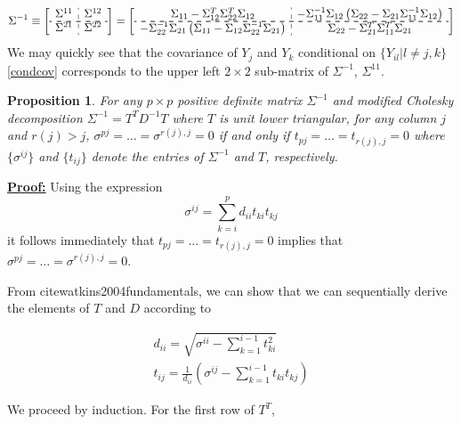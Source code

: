 \documentclass[12pt]{article}
\newtheorem{proposition}[theorem]{Proposition}
\theoremstyle{definition}
\begin{document}
\begin{equation}
\Sigma^{-1} \equiv \left[\begin{array}{c:c} \Sigma^{11} & \Sigma^{12}  \\ \cdashline{1-2}  \hdashline \Sigma^{21} & \Sigma^{22}  \end{array}\right]  = \left[\begin{array}{c:c}  \Sigma_{11} - \Sigma_{12}^T\Sigma_{22}^T\Sigma_{12}  & -\Sigma_{11}^{-1}\Sigma_{12}\left(\Sigma_{22} - \Sigma_{21}\Sigma_{11}^{-1}\Sigma_{12} \right) \\ \cdashline{1-2}  \hdashline -\Sigma_{22}^{-1}\Sigma_{21}\left(\Sigma_{11} - \Sigma_{12}\Sigma_{22}^{-1}\Sigma_{21} \right)  &  \Sigma_{22} - \Sigma_{21}^T\Sigma_{11}^T\Sigma_{21}  \end{array}\right] 
\end{equation}
\noindent
We may quickly see that the covariance of $Y_{j}$ and $Y_{k}$ conditional on $\lbrace Y_{il}\vert l\ne j,k \rbrace$ \eqref{condcov} corresponds to the upper left $2 \times 2$ sub-matrix of $\Sigma^{-1}$, $\Sigma^{11}$. 

\begin{proposition}
For any $p\times p$ positive definite matrix $\Sigma^{-1}$ and modified Cholesky decomposition $\Sigma^{-1} = T^T D^{-1}T$ where $T$ is unit lower triangular, for any column $j$ and $r\left(j\right)>j$, $\sigma^{pj} = \dots = \sigma^{r\left(j\right),j} = 0$ if and only if $t_{pj} = \dots = t_{r\left(j\right),j} = 0$ where $\lbrace \sigma^{ij}\rbrace$ and $\lbrace t_{ij}\rbrace$ denote the entries of $\Sigma^{-1}$ and $T$, respectively.
\end{proposition}

\underline{\bf Proof:} Using the expression
\[
\sigma^{ij} = \sum_{k=i}^p d_{ii}t_{ki}t_{kj}
\]
it follows immediately that $t_{pj} = \dots = t_{r\left(j\right),j} = 0$ implies that $\sigma^{pj} = \dots = \sigma^{r\left(j\right),j} = 0$.

From cite{watkins2004fundamentals}, we can show that we can sequentially derive the elements of $T$ and $D$ according to 

\begin{eqnarray*}
d_{ii} = \sqrt{\sigma^{ii}-\sum_{k=1}^{i-1} t_{ki}^2 }\\
t_{ij} = \frac{1}{d_{ii}}\left(\sigma^{ij} - \sum_{k=1}^{i-1} t_{ki}t_{kj} \right)
\end{eqnarray*}
\noindent

We proceed by induction. For the first row of $T^T$, 
\end{document}
